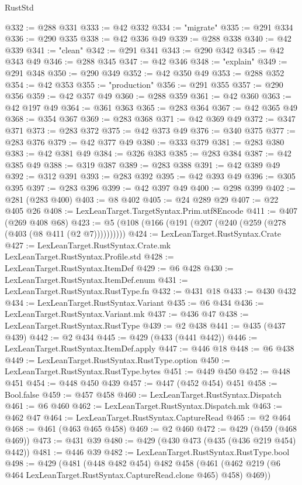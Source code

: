 \begin{lexlean}{RustStd}
\begin{coremodule}
@332 := @288 @331
@333 := @42 @332
@334 := "migrate"
@335 := @291 @334
@336 := @290 @335
@338 := @42 @336 @49
@339 := @288 @338
@340 := @42 @339
@341 := "clean"
@342 := @291 @341
@343 := @290 @342
@345 := @42 @343 @49
@346 := @288 @345
@347 := @42 @346
@348 := "explain"
@349 := @291 @348
@350 := @290 @349
@352 := @42 @350 @49
@353 := @288 @352
@354 := @42 @353
@355 := "production"
@356 := @291 @355
@357 := @290 @356
@359 := @42 @357 @49
@360 := @288 @359
@361 := @42 @360
@363 := @42 @197 @49
@364 := @361 @363
@365 := @283 @364
@367 := @42 @365 @49
@368 := @354 @367
@369 := @283 @368
@371 := @42 @369 @49
@372 := @347 @371
@373 := @283 @372
@375 := @42 @373 @49
@376 := @340 @375
@377 := @283 @376
@379 := @42 @377 @49
@380 := @333 @379
@381 := @283 @380
@383 := @42 @381 @49
@384 := @326 @383
@385 := @283 @384
@387 := @42 @385 @49
@388 := @319 @387
@389 := @283 @388
@391 := @42 @389 @49
@392 := @312 @391
@393 := @283 @392
@395 := @42 @393 @49
@396 := @305 @395
@397 := @283 @396
@399 := @42 @397 @49
@400 := @298 @399
@402 := @281 (@283 @400)
@403 := @8 @402
@405 := @24 @289 @29
@407 := @22 @405 @26
@408 := LexLeanTarget.TargetSyntax.Prim.utf8Encode
@411 := @407 (@269 @408 @68)
@423 := @5 (@108 (@166 (@191 (@207 (@240 (@259 (@278 (@403 (@8 @411 (@2 @7))))))))))
@424 := LexLeanTarget.RustSyntax.Crate
@427 := LexLeanTarget.RustSyntax.Crate.mk LexLeanTarget.RustSyntax.Profile.std
@428 := LexLeanTarget.RustSyntax.ItemDef
@429 := @6 @428
@430 := LexLeanTarget.RustSyntax.ItemDef.enum
@431 := LexLeanTarget.RustSyntax.RustType.fn
@432 := @431 @18
@433 := @430 @432
@434 := LexLeanTarget.RustSyntax.Variant
@435 := @6 @434
@436 := LexLeanTarget.RustSyntax.Variant.mk
@437 := @436 @47
@438 := LexLeanTarget.RustSyntax.RustType
@439 := @2 @438
@441 := @435 (@437 @439)
@442 := @2 @434
@445 := @429 (@433 (@441 @442))
@446 := LexLeanTarget.RustSyntax.ItemDef.apply
@447 := @446 @18
@448 := @6 @438
@449 := LexLeanTarget.RustSyntax.RustType.option
@450 := LexLeanTarget.RustSyntax.RustType.bytes
@451 := @449 @450
@452 := @448 @451
@454 := @448 @450 @439
@457 := @447 (@452 @454) @451
@458 := Bool.false
@459 := @457 @458
@460 := LexLeanTarget.RustSyntax.Dispatch
@461 := @6 @460
@462 := LexLeanTarget.RustSyntax.Dispatch.mk
@463 := @462 @47
@464 := LexLeanTarget.RustSyntax.CaptureRead
@465 := @2 @464
@468 := @461 (@463 @465 @458)
@469 := @2 @460
@472 := @429 (@459 (@468 @469))
@473 := @431 @39
@480 := @429 (@430 @473 (@435 (@436 @219 @454) @442))
@481 := @446 @39
@482 := LexLeanTarget.RustSyntax.RustType.bool
@498 := @429
    (@481
      (@448 @482 @454)
      @482
      @458
      (@461 (@462 @219 (@6 @464 LexLeanTarget.RustSyntax.CaptureRead.clone @465) @458) @469))

\end{coremodule}
\end{lexlean}
